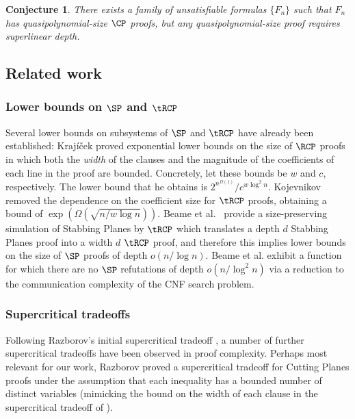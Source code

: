 \documentclass[11pt]{article}
\newtheorem{conjecture}[theorem]{Conjecture}
\begin{document}
\begin{conjecture}\label{conj:deepProofs}
	There exists a family of unsatisfiable formulas $\{F_n\}$ such that $F_n$ has quasipolynomial-size $\CP$ proofs, but any quasipolynomial-size proof requires superlinear depth.
\end{conjecture}





\subsection{Related work}
%

\subsubsection{Lower bounds on $\SP$ and $\tRCP$} Several lower bounds on subsystems of $\SP$ and $\tRCP$ have already been established: %
Kraj\'{i}\v{c}ek \cite{Krajicek98} proved exponential lower bounds on the size of $\RCP$ proofs in which both the \emph{width} of the clauses and the magnitude of the coefficients of each line in the proof are bounded. Concretely, let these bounds be
$w$ and $c$, respectively. 
The lower bound that he obtains is $2^{n^{\Omega(1)}}/c^{w \log^2 n}$. Kojevnikov \cite{Kojevnikov07} removed the dependence on the coefficient size for $\tRCP$ proofs, obtaining a bound of $\exp(\Omega(\sqrt{n/w \log n}))$. Beame et al.~\cite{BeameFIKPPR18} provide a size-preserving simulation of Stabbing Planes by $\tRCP$ which translates a depth $d$ Stabbing Planes proof into a width $d$ $\tRCP$ proof, %
and therefore this implies lower bounds on the size of $\SP$ proofs of depth $o(n/\log n)$. Beame et al. \cite{BeameFIKPPR18} exhibit a function for which there are no $\SP$ refutations of depth $o(n / \log^2 n)$ via a reduction to the communication complexity of the CNF search problem. %

\subsubsection{Supercritical tradeoffs} %
%
%
%
Following Razborov's initial supercritical tradeoff \cite{Razborov16},  %
a number of
further  %
supercritical tradeoffs have been observed in proof complexity.  
Perhaps most relevant for our work, Razborov \cite{Razborov17} proved a supercritical tradeoff for Cutting Planes proofs under the assumption that each inequality has a bounded number of distinct variables (mimicking the bound on the width of each clause in the supercritical tradeoff of \cite{Razborov16}). 
\end{document}
